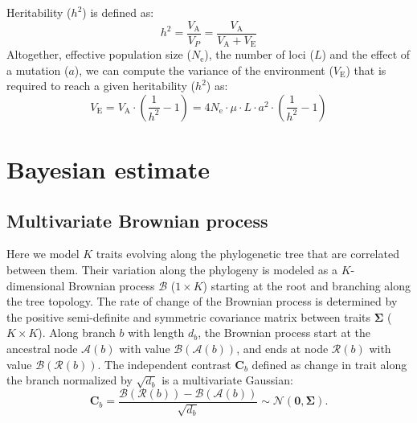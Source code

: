 \documentclass{article}
\newcommand{\Multiply}{\cdot}
\newcommand{\UniDimArray}[1]{\bm{#1}}
\newcommand{\BiDimArray}[1]{\bm{#1}}
\newcommand{\Ne}{N_{\text{e}}}
\newcommand{\Branch}{b}
\newcommand{\Trait}{P}
\newcommand{\Heritability}{h^2}
\newcommand{\VecZero}{\UniDimArray{0}}
\newcommand{\MutationRatePheno}{\mu}
\newcommand{\NbrLoci}{L}
\newcommand{\VarPhenotype}{V_{\Trait}}
\newcommand{\VarGenetic}{V_{\mathrm{A}}}
\newcommand{\VarEnv}{V_{\mathrm{E}}}
\newcommand{\Ntrait}{K}
\newcommand{\contrast}{\UniDimArray{C}}
\newcommand{\Covariancematrix}{\Sigma}
\newcommand{\CovarianceMatrix}{\BiDimArray{\Covariancematrix}}
\newcommand{\brownian}{\mathcal{B}}
\newcommand{\Brownian}{\UniDimArray{\brownian}}
\begin{document}
Heritability ($\Heritability$) is defined as:
\begin{equation}
    \Heritability = \frac{\VarGenetic}{\VarPhenotype} = \frac{\VarGenetic}{\VarGenetic + \VarEnv}\label{eq:simu-heritability}
\end{equation}
Altogether, effective population size ($\Ne$), the number of loci ($\NbrLoci$) and the effect of a mutation ($a$), we can compute the variance of the environment ($\VarEnv$) that is required to reach a given heritability ($\Heritability$) as:
\begin{equation}
    \VarEnv = \VarGenetic \Multiply \left( \frac{1}{\Heritability} - 1 \right) = 4 \Ne \Multiply \MutationRatePheno \Multiply \NbrLoci \Multiply a^2 \Multiply \left( \frac{1}{\Heritability} - 1 \right) \label{eq:simu-var-env}
\end{equation}

\newpage
\section{Bayesian estimate}\label{sec:bayesian-estimate}

\subsection{Multivariate Brownian process}\label{subsec:multivariate-brownian-process}
Here we model $\Ntrait$ traits evolving along the phylogenetic tree that are correlated between them.
Their variation along the phylogeny is modeled as a $\Ntrait$-dimensional Brownian process $\Brownian$ ($1 \times \Ntrait$) starting at the root and branching along the tree topology.
The rate of change of the Brownian process is determined by the positive semi-definite and symmetric covariance matrix between traits $\CovarianceMatrix$ ($\Ntrait \times \Ntrait$).
Along branch $\Branch$ with length $d_{\Branch}$, the Brownian process start at the ancestral node $\mathcal{A}(\Branch)$ with value $\Brownian(\mathcal{A}(\Branch))$, and ends at node $\mathcal{R}(\Branch)$  with value $\Brownian(\mathcal{R}(\Branch))$.
The independent contrast $\contrast_{\Branch}$ defined as change in trait along the branch normalized by $\sqrt {d_{\Branch}}$ is a multivariate Gaussian:
\begin{equation}
    \label{eq:DistribBrownian}
    \contrast_{\Branch} = \frac{\Brownian (\mathcal{R}(\Branch)) - \Brownian (\mathcal{A}(\Branch)) }{\sqrt {d_{\Branch}}} \sim \mathcal{N}\left(\VecZero, \CovarianceMatrix \right).
\end{equation}
\end{document}
